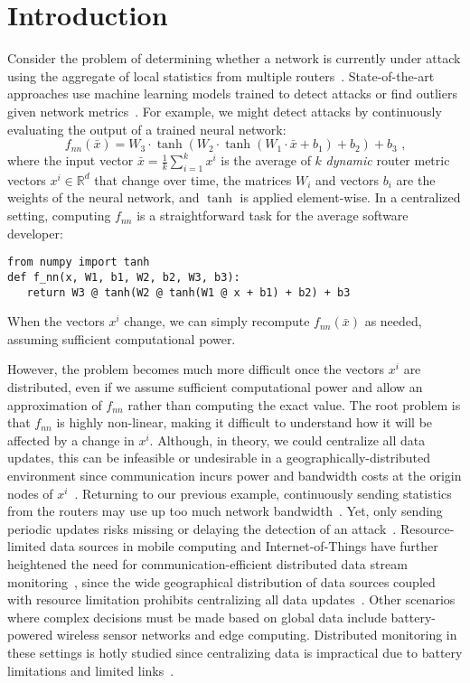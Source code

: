 \section{Introduction} \label{sec:introduction}

Consider the problem of determining whether a network is currently under attack using the aggregate of local statistics from multiple routers~\cite{2015_Bohatei}.
State-of-the-art approaches use machine learning models trained to detect attacks or find outliers given network metrics~\cite{8066291, 10.1016/j.cose.2014.05.011}.
%
For example, we might detect attacks by continuously evaluating the output of a trained neural network:
\[
    f_{nn}(\bar{x}) = W_3 \cdot \tanh \left( W_2 \cdot \tanh \left( W_1 \cdot \bar{x}  + b_1  \right) + b_2  \right) + b_3 \text{~,}
\]
where the input vector $\bar{x}=\frac{1}{k}\sum_{i=1}^{k} x^i$ is the average of $k$ \emph{dynamic} router metric vectors $x^i \in \mathbb{R}^d$ that change over time,
the matrices $W_i$ and vectors $b_i$ are the weights of the neural network, and $\tanh$ is applied element-wise.
In a centralized setting, computing $f_{nn}$ is a straightforward task for the average software developer:
\begin{lstlisting}
from numpy import tanh
def f_nn(x, W1, b1, W2, b2, W3, b3):
   return W3 @ tanh(W2 @ tanh(W1 @ x + b1) + b2) + b3
\end{lstlisting}
When the vectors $x^i$ change, we can simply recompute $f_{nn}(\bar{x})$ as needed, assuming sufficient computational power.

However, the problem becomes much more difficult once the vectors $x^i$ are distributed, even if we assume sufficient computational power and allow an approximation of $f_{nn}$ rather than computing the exact value.
The root problem is that $f_{nn}$ is highly non-linear, making it difficult to understand how it will be affected by a change in $x^i$.
Although, in theory, we could centralize all data updates, this can be infeasible or undesirable in a geographically-distributed environment since communication incurs power and bandwidth costs at the origin nodes of $x^i$~\cite{kang2017neurosurgeon,anastasi2009energy,Stylianopoulos2018gmsystems}.
Returning to our previous example, continuously sending statistics from the routers may use up too much network bandwidth~\cite{gigascope,gabel:entropy_approximation,giatrakos2012prediction,2019_nitrosketch}.
Yet, only sending periodic updates risks missing or delaying the detection of an attack~\cite{benbasat2018memento,gabel:entropy_approximation}.
Resource-limited data sources in mobile computing and Internet-of-Things have further heightened the need for communication-efficient distributed data stream monitoring~\cite{distributed_data_management,ecmlpkdd2019,ecmlpkdd2020}, since the wide geographical distribution of data sources coupled with resource limitation prohibits centralizing all data updates~\cite{garofalakis2013sketch}.
Other scenarios where complex decisions must be made based on global data include battery-powered wireless sensor networks and edge computing. 
Distributed monitoring in these settings is hotly studied since centralizing data is impractical due to battery limitations and limited links~\cite{anastasi2009energy,10.1145/3093337.3037698,mortazavi2020feather}.

